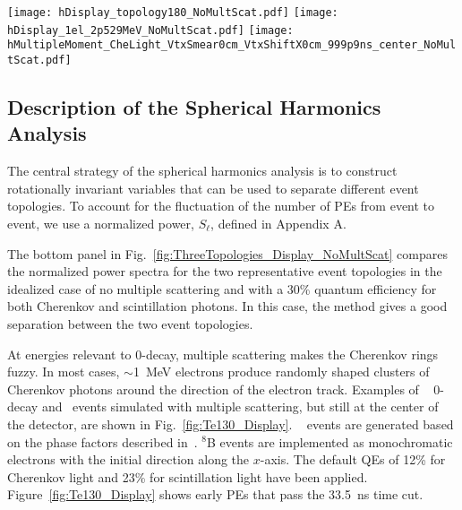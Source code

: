 \begin{figure*}[h]
  \centering
  \texttt{[image: hDisplay\_topology180\_NoMultScat.pdf]}
  \texttt{[image: hDisplay\_1el\_2p529MeV\_NoMultScat.pdf]}
  \texttt{[image: hMultipleMoment\_CheLight\_VtxSmear0cm\_VtxShiftX0cm\_999p9ns\_center\_NoMultScat.pdf]}
  \caption{\emph{Top panels:} Idealized event displays, with multiple
scattering turned off and at the center of the detector, of:
(\emph{top left}) a signal event with two 1.26~MeV back-to-back
electrons; and (\emph{top right}) a \B~neutrino background event with
single 2.53~MeV electron. A 30\% QE is assumed for both Cherenkov
PEs (\emph{triangles}) and scintillation PEs (\emph{dots}).  
\emph{Bottom panel:} The normalized power spectrum $S_{\ell}$ for the
Cherenkov PEs only, calculated event-by-event for 100 events for the two
above topologies. The heights of the vertical bars correspond to event by event
variation $(\pm 1 ~\sigma)$.}
  \label{fig:ThreeTopologies_Display_NoMultScat}
\end{figure*}


\subsection{Description of the Spherical Harmonics Analysis}

The central strategy of the spherical harmonics analysis is to
construct rotationally invariant variables that can be used to
separate different event topologies. To account for the fluctuation of
the number of PEs from event to event, we use a normalized power,
$S_{\ell}$, defined in Appendix A.

The bottom panel in Fig.~\ref{fig:ThreeTopologies_Display_NoMultScat}
compares the normalized power spectra for the two representative event
topologies in the idealized case of no multiple scattering and with a 30\%
quantum efficiency for both Cherenkov and scintillation
photons. In this case, the method gives a good separation between the
two event topologies.

At energies relevant to 0\nbb-decay, multiple scattering makes the Cherenkov 
rings fuzzy. In most cases,
$\sim$1~MeV electrons produce randomly shaped clusters of Cherenkov
photons around the direction of the electron track.  Examples of \Te~
0\nbb-decay and \B~events simulated with multiple scattering, but still at
the center of the detector, are shown in Fig.~\ref{fig:Te130_Display}.
\Te~ events are generated based on the phase factors described
in~\cite{Jenni}.  $^{8}$B events are implemented as
monochromatic electrons with the initial direction along the
$x$-axis. The default QEs of 12\% for Cherenkov light and 23\% for
scintillation light have been  applied. Figure~\ref{fig:Te130_Display} shows
early PEs that pass the 33.5~ns time cut. 

